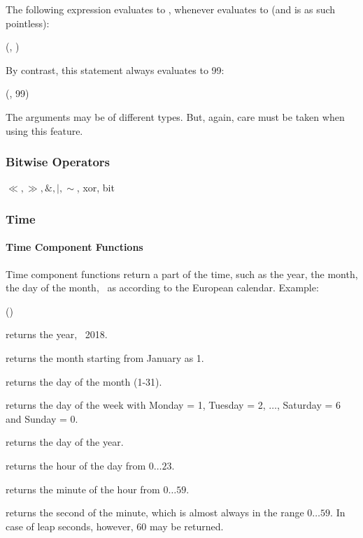 The following expression evaluates to ,
whenever  evaluates to 
(and is as such pointless):

(, )

By contrast, this statement always evaluates to 99:

(, 99)

The arguments may be of different types.
But, again, care must be taken when using this feature.

\subsubsection{Bitwise Operators}
$\ll, \gg, \&, |,\sim$, xor, bit


\subsubsection{Time}
\paragraph{Time Component Functions}
Time component functions return a part of the time,
such as the year, the month, the day of the month,
\etc\ as  according to the European calendar.
Example:

 ()
 

 returns the year, \eg\ 2018.

returns the month starting from January as 1.

returns the day of the month (1-31).

returns the day of the week with
Monday = 1, Tuesday = 2, $\dots$, Saturday = 6 and
Sunday = 0.

returns the day of the year.

returns the hour of the day from $0\dots 23$.

returns the minute of the hour from $0\dots 59$.

returns the second of the minute,
which is almost always in the range $0\dots 59$.
In case of leap seconds, however, 60 may be returned.

